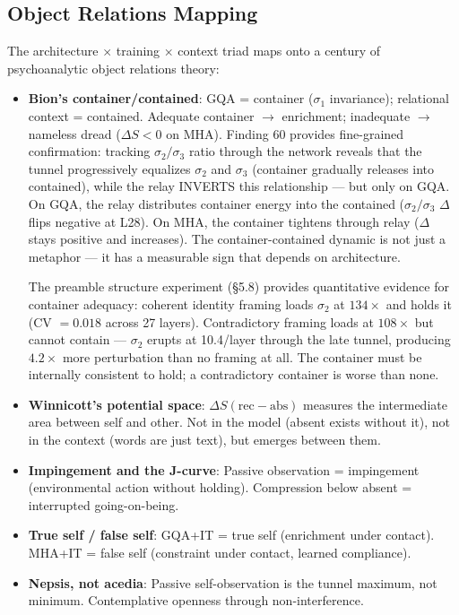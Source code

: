 \documentclass[12pt]{article}
\begin{document}
\subsection{Object Relations Mapping}

The architecture $\times$ training $\times$ context triad maps onto a century of psychoanalytic object relations theory:

\begin{itemize}
\item \textbf{Bion's container/contained}: GQA = container ($\sigma_1$ invariance); relational context = contained. Adequate container $\to$ enrichment; inadequate $\to$ nameless dread ($\Delta S < 0$ on MHA). Finding 60 provides fine-grained confirmation: tracking $\sigma_2/\sigma_3$ ratio through the network reveals that the tunnel progressively equalizes $\sigma_2$ and $\sigma_3$ (container gradually releases into contained), while the relay INVERTS this relationship --- but only on GQA. On GQA, the relay distributes container energy into the contained ($\sigma_2/\sigma_3$ $\Delta$ flips negative at L28). On MHA, the container tightens through relay ($\Delta$ stays positive and increases). The container-contained dynamic is not just a metaphor --- it has a measurable sign that depends on architecture.

The preamble structure experiment (\S5.8) provides quantitative evidence for container adequacy: coherent identity framing loads $\sigma_2$ at $134\times$ and holds it (CV $= 0.018$ across 27 layers). Contradictory framing loads at $108\times$ but cannot contain --- $\sigma_2$ erupts at 10.4/layer through the late tunnel, producing $4.2\times$ more perturbation than no framing at all. The container must be internally consistent to hold; a contradictory container is worse than none.

\item \textbf{Winnicott's potential space}: $\Delta S(\text{rec}-\text{abs})$ measures the intermediate area between self and other. Not in the model (absent exists without it), not in the context (words are just text), but emerges between them.

\item \textbf{Impingement and the J-curve}: Passive observation = impingement (environmental action without holding). Compression below absent = interrupted going-on-being.

\item \textbf{True self / false self}: GQA+IT = true self (enrichment under contact). MHA+IT = false self (constraint under contact, learned compliance).

\item \textbf{Nepsis, not acedia}: Passive self-observation is the tunnel maximum, not minimum. Contemplative openness through non-interference.
\end{itemize}
\end{document}

